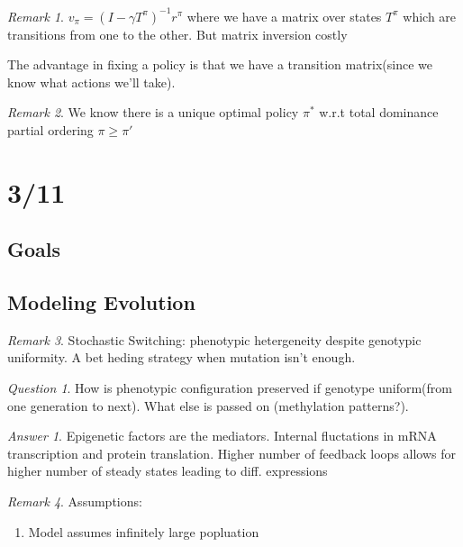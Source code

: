 \documentclass[11pt]{article}
\theoremstyle{remark}
\newtheorem{remark}{Remark}
\newtheorem{quest}{Question}
\newtheorem{ans}{Answer}
\begin{document}
\begin{remark}
	$v_{\pi} = (I-\gamma T^{\pi})^{-1}r^{\pi}$ where we have a matrix over states $T^{\pi}$ which are transitions from one to the other. But matrix inversion costly 

	The advantage in fixing a policy is that we have a transition matrix(since we know what actions we'll take).
\end{remark}

\begin{remark}
	We know there is a unique optimal policy $\pi^*$ w.r.t total dominance partial ordering $\pi \geq \pi'$
\end{remark}

\section{3/11}

\subsection{Goals}

\subsection{Modeling Evolution}

\begin{remark}
	Stochastic Switching: phenotypic hetergeneity despite genotypic uniformity. A bet heding strategy when mutation isn't enough.
\end{remark}

\begin{quest}
	How is phenotypic configuration preserved if genotype uniform(from one generation to next). What else is passed on (methylation patterns?).
\end{quest}

\begin{ans}
	Epigenetic factors are the mediators. Internal fluctations in mRNA transcription and protein translation. Higher number of feedback loops allows for higher number of steady states leading to diff. expressions
\end{ans}

\begin{remark}
	Assumptions:
	\begin{enumerate}
		\item Model assumes infinitely large popluation
	\end{enumerate}
\end{remark}
\end{document}
